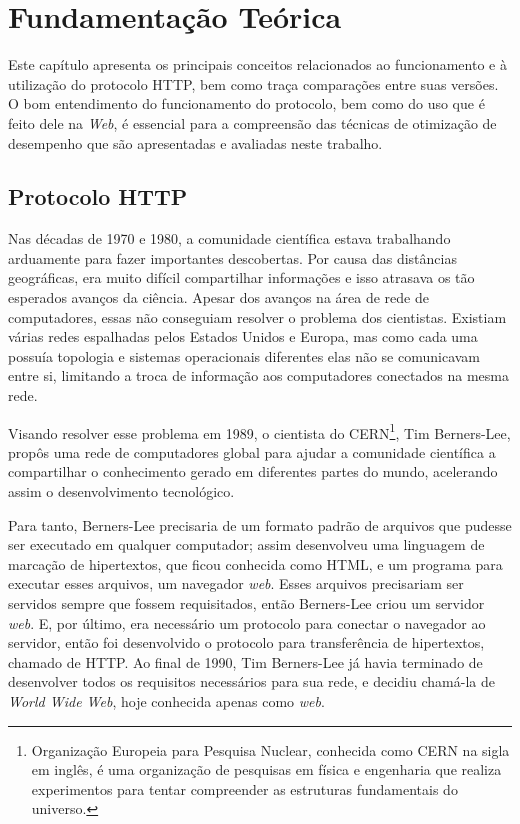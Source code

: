 %
%

\chapter{Fundamentação Teórica}
\label{chap:fundamentacaoTeorica}

Este capítulo apresenta os principais conceitos relacionados ao funcionamento e à utilização do protocolo HTTP, bem como traça comparações entre suas versões. O bom entendimento do funcionamento do protocolo, bem como do uso que é feito dele na \textit{Web}, é essencial para a compreensão das técnicas de otimização de desempenho que são apresentadas e avaliadas neste trabalho.

\section{Protocolo HTTP}
\label{sec:http}

Nas décadas de 1970 e 1980, a comunidade científica estava trabalhando arduamente para fazer importantes descobertas. Por causa das distâncias geográficas, era muito difícil compartilhar informações e isso atrasava os tão esperados avanços da ciência. Apesar dos avanços na área de rede de computadores, essas não conseguiam resolver o problema dos cientistas. Existiam várias redes espalhadas pelos Estados Unidos e Europa, mas como cada uma possuía topologia e sistemas operacionais diferentes elas não se comunicavam entre si, limitando a troca de informação aos computadores conectados na mesma rede.\cite{WebHistory}

Visando resolver esse problema em 1989, o cientista do CERN\footnote{Organização Europeia para Pesquisa Nuclear, conhecida como CERN na sigla em inglês, é uma organização de pesquisas em física e engenharia que realiza experimentos para tentar compreender as estruturas fundamentais do universo.}, Tim Berners-Lee, propôs uma rede de computadores global para ajudar a comunidade científica a compartilhar o conhecimento gerado em diferentes partes do mundo, acelerando assim o desenvolvimento tecnológico.\cite{WebHistory}

Para tanto, Berners-Lee precisaria de um formato padrão de arquivos que pudesse ser executado em qualquer computador; assim desenvolveu uma linguagem de marcação de hipertextos,  que ficou conhecida como HTML, e um programa para executar esses arquivos, um navegador \textit{web}. Esses arquivos precisariam ser servidos sempre que fossem requisitados, então Berners-Lee criou um servidor \textit{web}. E, por último, era necessário um protocolo para conectar o navegador ao servidor, então foi desenvolvido o protocolo para transferência de hipertextos, chamado de HTTP. Ao final de 1990, Tim Berners-Lee já havia terminado de desenvolver todos os requisitos necessários para sua rede, e decidiu chamá-la de \textit{World Wide Web}, hoje conhecida apenas como \textit{web}.\cite{WebHistory}


